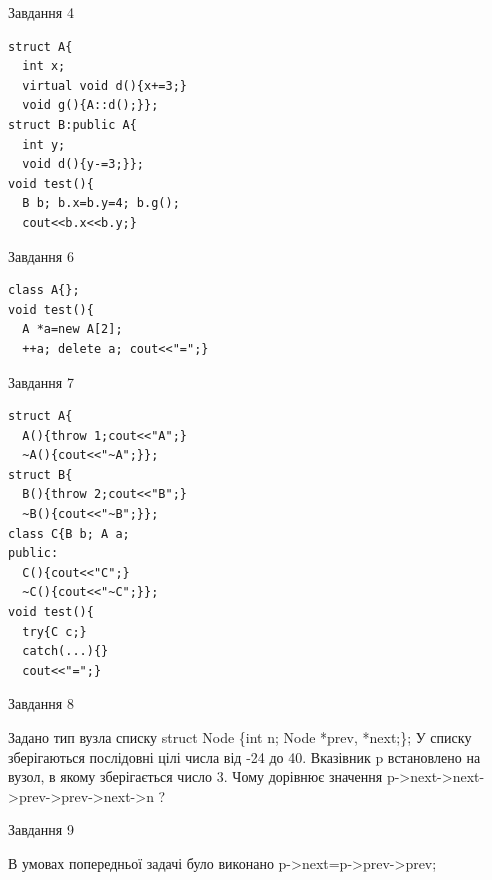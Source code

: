 \documentclass[12pt, ukrainian]{article}
\begin{document}
{\begin{minipage}[t]{11cm}
\end{minipage}
\vline \hspace{8mm}
\begin{minipage}[t]{7cm}
               
{\begin{center}Завдання {4}\end{center}}
\vspace{-6mm}

\begin{verbatim}
struct A{
  int x;
  virtual void d(){x+=3;}
  void g(){A::d();}};
struct B:public A{
  int y;
  void d(){y-=3;}};
void test(){
  B b; b.x=b.y=4; b.g();
  cout<<b.x<<b.y;}
\end{verbatim}            


               
{\begin{center}Завдання {6}\end{center}}
\vspace{-6mm}

\begin{verbatim}
class A{};
void test(){
  A *a=new A[2]; 
  ++a; delete a; cout<<"=";} 
\end{verbatim}            


               
{\begin{center}Завдання {7}\end{center}}
\vspace{-6mm}

\begin{verbatim}
struct A{
  A(){throw 1;cout<<"A";}
  ~A(){cout<<"~A";}};
struct B{
  B(){throw 2;cout<<"B";}
  ~B(){cout<<"~B";}};
class C{B b; A a;
public:
  C(){cout<<"C";}
  ~C(){cout<<"~C";}};
void test(){
  try{C c;} 
  catch(...){} 
  cout<<"=";}
\end{verbatim}            


\end{minipage}
               
{\begin{center}Завдання {8}\end{center}}
\vspace{-6mm}
Задано тип вузла списку
struct Node \{int n; Node *prev, *next;\};
У списку зберігаються послідовні цілі числа від -24 до 40. Вказівник p встановлено на вузол, в якому зберігається число 3.
Чому дорівнює значення p->next->next->prev->prev->next->n ?\par

               
{\begin{center}Завдання {9}\end{center}}
\vspace{-6mm}
В умовах попередньої задачі було виконано p->next=p->prev->prev;

}
\end{document}
